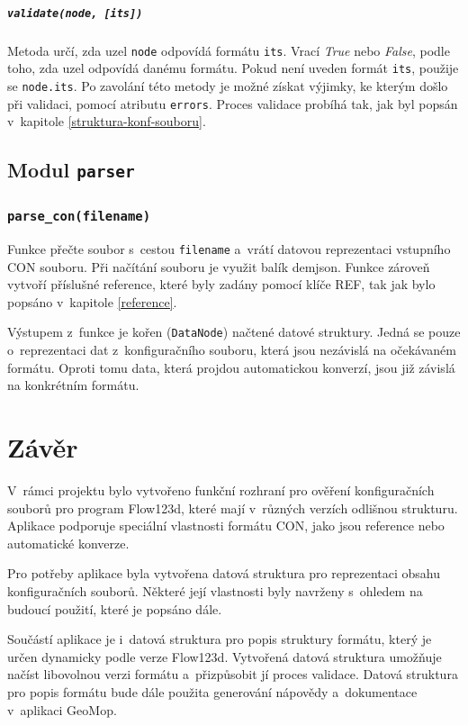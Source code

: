 \documentclass[FM,MP]{tulthesis}
\begin{document}
				\paragraph{\texttt{validate(node, [its])}}
					Metoda určí, zda uzel \texttt{node} odpovídá formátu \texttt{its}. Vrací \textit{True} nebo \textit{False}, podle toho, zda uzel odpovídá danému formátu. Pokud není uveden formát \texttt{its}, použije se \texttt{node.its}. Po zavolání této metody je možné získat výjimky, ke kterým došlo při validaci, pomocí atributu \texttt{errors}. Proces validace probíhá tak, jak byl popsán v~kapitole \ref{struktura-konf-souboru}.


	\section{Modul \texttt{parser}}
		\subsection*{\texttt{parse\_con(filename)}}
			Funkce přečte soubor s~cestou \texttt{filename} a~vrátí datovou reprezentaci vstupního CON souboru. Při načítání souboru je využit balík demjson\cite{bib:demjson}. Funkce zároveň vytvoří příslušné reference, které byly zadány pomocí klíče REF, tak jak bylo popsáno v~kapitole \ref{reference}.

			Výstupem z~funkce je kořen (\texttt{DataNode}) načtené datové struktury. Jedná se pouze o~reprezentaci dat z~konfiguračního souboru, která jsou nezávislá na očekávaném formátu. Oproti tomu data, která projdou automatickou konverzí, jsou již závislá na konkrétním formátu.

\chapter{Závěr}
	V~rámci projektu bylo vytvořeno funkční rozhraní pro ověření konfiguračních souborů pro program Flow123d, které mají v~různých verzích odlišnou strukturu. Aplikace podporuje speciální vlastnosti formátu CON, jako jsou reference nebo automatické konverze.

	Pro potřeby aplikace byla vytvořena datová struktura pro reprezentaci obsahu konfiguračních souborů. Některé její vlastnosti byly navrženy s~ohledem na budoucí použití, které je popsáno dále.

	Součástí aplikace je i~datová struktura pro popis struktury formátu, který je určen dynamicky podle verze Flow123d. Vytvořená datová struktura umožňuje na\-číst libovolnou verzi formátu a~přizpůsobit jí proces validace. Datová struktura pro popis formátu bude dále použita generování nápovědy a~dokumentace v~aplikaci GeoMop.
\end{document}
